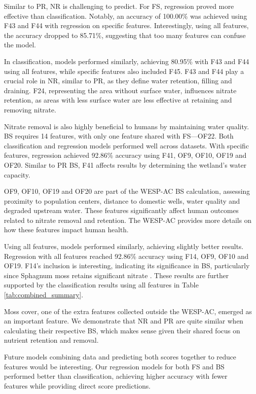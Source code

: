 \documentclass[12pt,letterpaper]{article}
\begin{document}
Similar to \ac{PR}, \ac{NR} is challenging to predict.
For \ac{FS}, regression proved more effective than classification.
Notably, an accuracy of 100.00\% was achieved using F43 and F44 with regression on specific features.
Interestingly, using all features, the accuracy dropped to 85.71\%, suggesting that too many features can confuse the model.

In classification, models performed similarly, achieving 80.95\% with F43 and F44 using all features, while specific features also included F45.
F43 and F44 play a crucial role in \ac{NR}, similar to \ac{PR}, as they define water retention, filling and draining.
F24, representing the area without surface water, influences nitrate retention, as areas with less surface water are less effective at retaining and removing nitrate.

Nitrate removal is also highly beneficial to humans by maintaining water quality.
\ac{BS} requires 14 features, with only one feature shared with \ac{FS}—OF22.
Both classification and regression models performed well across datasets.
With specific features, regression achieved 92.86\% accuracy using F41, OF9, OF10, OF19 and OF20.
Similar to \ac{PR} \ac{BS}, F41 affects results by determining the wetland's water capacity.

OF9, OF10, OF19 and OF20 are part of the WESP-AC \ac{BS} calculation, assessing proximity to population centers, distance to domestic wells, water quality and degraded upstream water.
These features significantly affect human outcomes related to nitrate removal and retention.
The WESP-AC provides more details on how these features impact human health.

Using all features, models performed similarly, achieving slightly better results.
Regression with all features reached 92.86\% accuracy using F14, OF9, OF10 and OF19.
F14’s inclusion is interesting, indicating its significance in \ac{BS}, particularly since Sphagnum moss retains significant nitrate \cite{williams1999nitrogen}.
These results are further supported by the classification results using all features in Table \ref{tab:combined_summary}.

Moss cover, one of the extra features collected outside the WESP-AC, emerged as an important feature.
We demonstrate that \ac{NR} and \ac{PR} are quite similar when calculating their respective \ac{BS}, which makes sense given their shared focus on nutrient retention and removal.

Future models combining data and predicting both scores together to reduce features would be interesting.
Our regression models for both \ac{FS} and \ac{BS} performed better than classification, achieving higher accuracy with fewer features while providing direct score predictions.
\end{document}
